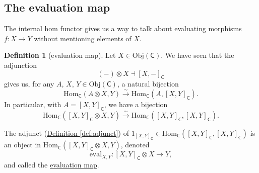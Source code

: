 \documentclass[a4paper,10pt]{scrreprt}
\newcommand{\defn}[1]{\ul{#1}}
\newcommand{\Obj}{\mathrm{Obj}}
\newcommand{\Hom}{\mathrm{Hom}}
\newcommand{\ev}{\mathrm{eval}}
\theoremstyle{definition}
\newtheorem{definition}{Definition}[section]
\theoremstyle{plain}
\theoremstyle{remark}
\begin{document}
\subsection{The evaluation map}
The internal hom functor gives us a way to talk about evaluating morphisms $f\colon X \to Y$ without mentioning elements of $X$.
\begin{definition}[evaluation map]
  \label{def:evaluationmap}
  Let $X \in \Obj(\mathsf{C})$. We have seen that the adjunction
  \begin{equation*}
    (-) \otimes X \dashv [X, -]_{\mathsf{C}}
  \end{equation*}
  gives us, for any $A$, $X$, $Y \in \Obj(\mathsf{C})$, a natural bijection
  \begin{equation*}
    \Hom_{\mathsf{C}}(A \otimes X, Y) \overset{\sim}{\to} \Hom_{\mathsf{C}}(A, [X, Y]_{\mathsf{C}}).
  \end{equation*}
  In particular, with $A = [X, Y]_{\mathsf{C}}$, we have a bijection
  \begin{equation*}
    \Hom_{\mathsf{C}}([X, Y]_{\mathsf{C}} \otimes X, Y) \overset{\sim}{\to} \Hom_{\mathsf{C}}([X, Y]_{\mathsf{C}}, [X, Y]_{\mathsf{C}}).
  \end{equation*}

  The adjunct (\hyperref[def:adjunct]{Definition \ref*{def:adjunct}}) of $1_{[X, Y]_{\mathsf{C}}} \in \Hom_{\mathsf{C}}([X, Y]_{\mathsf{C}}, [X, Y]_{\mathsf{C}})$ is an object in $\Hom_{\mathsf{C}}\left( [X, Y]_{\mathsf{C}} \otimes X, Y \right)$, denoted 
  \begin{equation*}
    \ev_{X, Y}\colon [X, Y]_{\mathsf{C}} \otimes X \to Y,
  \end{equation*}
  and called the \defn{evaluation map}.
\end{definition}
\end{document}
